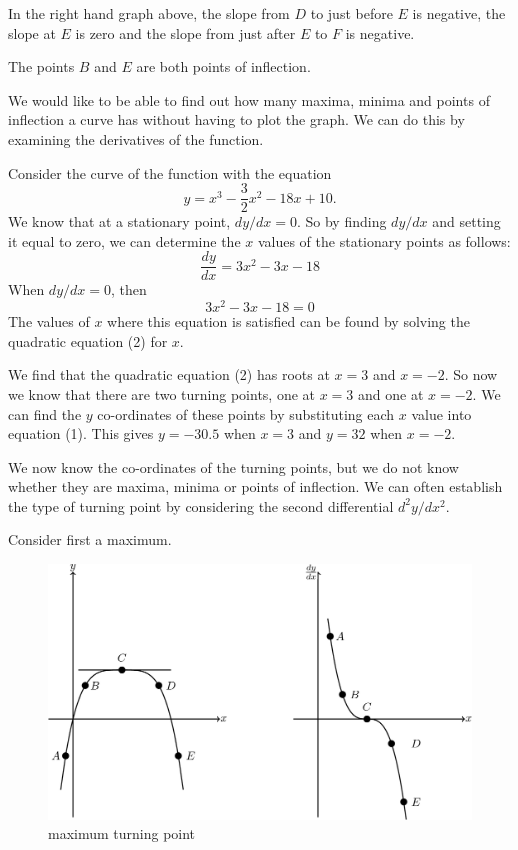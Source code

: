 \documentclass[
  11pt,
  oneside]{book}
\newcommand{\slide}{}
\theoremstyle{definition}
\theoremstyle{definition}
\theoremstyle{definition}
\theoremstyle{definition}
\theoremstyle{remark}
\begin{document}
In the right hand graph above, the slope from \(D\) to just before \(E\) is negative, the slope at \(E\) is zero and the slope from just after \(E\) to \(F\) is negative.

The points \(B\) and \(E\) are both points of inflection.
\slide

We would like to be able to find out how many maxima, minima and points of inflection a curve has without having to plot the graph. We can do this by examining the derivatives of the function.

Consider the curve of the function with the equation
\[
y = x^3-\frac 32x^2-18x+10.
\]
We know that at a stationary point, \(dy/dx=0\). So by finding \(dy/dx\) and setting it equal to zero, we can determine the \(x\) values of the stationary points as follows:
\[
\frac{dy}{dx} = 3x^2-3x-18\tag{1}
\]
When \(dy/dx = 0\), then
\[
3x^2-3x-18=0\tag{2}
\]
The values of \(x\) where this equation is satisfied can be found by solving the quadratic equation (2) for \(x\).

We find that the quadratic equation (2) has roots at \(x = 3\) and \(x = -2\). So now we know that there are two turning points, one at \(x = 3\) and one at \(x = -2\). We can find the \(y\) co-ordinates of these points by substituting each \(x\) value into equation (1). This gives \(y = -30.5\) when \(x = 3\) and \(y = 32\) when \(x = -2\).

We now know the co-ordinates of the turning points, but we do not know whether they are maxima, minima or points of inflection. We can often establish the type of turning point by considering the second differential \(d^2y/dx^2\).
\slide

Consider first a maximum.

\begin{figure}

{\centering \includegraphics[width=0.6\linewidth]{tikztopng-figure8} 

}

\caption{maximum turning point}\label{fig:unnamed-chunk-18}
\end{figure}
\end{document}
